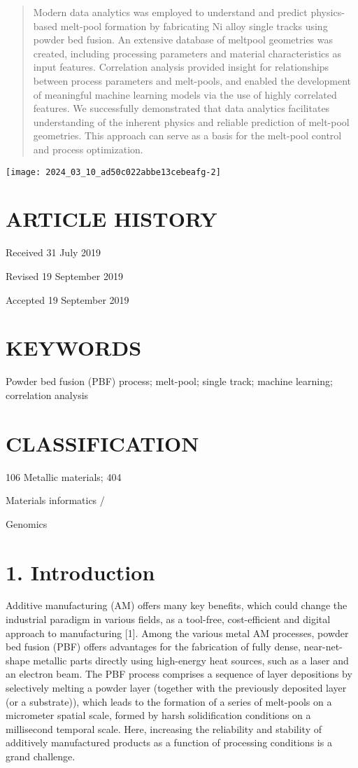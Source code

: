 \documentclass[10pt]{article}
\begin{document}
\begin{abstract}
Modern data analytics was employed to understand and predict physics-based melt-pool formation by fabricating Ni alloy single tracks using powder bed fusion. An extensive database of meltpool geometries was created, including processing parameters and material characteristics as input features. Correlation analysis provided insight for relationships between process parameters and melt-pools, and enabled the development of meaningful machine learning models via the use of highly correlated features. We successfully demonstrated that data analytics facilitates understanding of the inherent physics and reliable prediction of melt-pool geometries. This approach can serve as a basis for the melt-pool control and process optimization.
\end{abstract}

\begin{center}
\texttt{[image: 2024\_03\_10\_ad50c022abbe13cebeafg-2]}
\end{center}

\section*{ARTICLE HISTORY}
Received 31 July 2019

Revised 19 September 2019

Accepted 19 September 2019

\section*{KEYWORDS}
Powder bed fusion (PBF) process; melt-pool; single track; machine learning; correlation analysis

\section*{CLASSIFICATION}
106 Metallic materials; 404

Materials informatics /

Genomics

\section*{1. Introduction}
Additive manufacturing (AM) offers many key benefits, which could change the industrial paradigm in various fields, as a tool-free, cost-efficient and digital approach to manufacturing [1]. Among the various metal AM processes, powder bed fusion (PBF) offers advantages for the fabrication of fully dense, near-net-shape metallic parts directly using high-energy heat sources, such as a laser and an electron beam. The PBF process comprises a sequence of layer depositions by selectively melting a powder layer (together with the previously deposited layer (or a substrate)), which leads to the formation of a series of melt-pools on a micrometer spatial scale, formed by harsh solidification conditions on a millisecond temporal scale. Here, increasing the reliability and stability of additively manufactured products as a function of processing conditions is a grand challenge.
\end{document}
